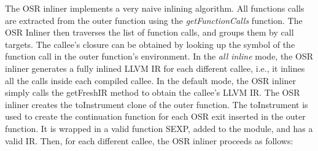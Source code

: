 The OSR inliner implements a very naive inlining algorithm.
All functions calls are extracted from the outer function using the \textit{getFunctionCalls} function.
The OSR Inliner then traverses the list of function calls, and groups them by call targets.
The callee's closure can be obtained by looking up the symbol of the function call in the outer function's environment.
In the \textit{all inline} mode, the OSR inliner generates a fully inlined LLVM IR for each different callee, i.e., it inlines all the calls inside each compiled callee. 
In the default mode, the OSR inliner simply calls the getFreshIR method to obtain the callee's LLVM IR.
The OSR inliner creates the toInstrument clone of the outer function.
The toInstrument is used to create the continuation function for each OSR exit inserted in the outer function.
It is wrapped in a valid function SEXP, added to the module, and has a valid IR.
Then, for each different callee, the OSR inliner proceeds as follows: 
